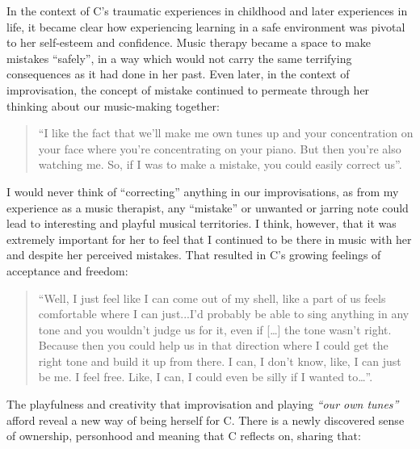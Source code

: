 \documentclass[authordate, empirical]{jote-new-article}
\begin{document}
In the context of C's traumatic experiences in childhood and later experiences in life, it became clear how experiencing learning in a safe environment was pivotal to her self-esteem and confidence. Music therapy became a space to make mistakes “safely”, in a way which would not carry the same terrifying consequences as it had done in her past. Even later, in the context of improvisation, the concept of mistake continued to permeate through her thinking about our music-making together:


\begin{quote}
  “I like the fact that we'll make me own tunes up and your concentration on your face where you're concentrating on your piano. But then you're also watching me. So, if I was to make a mistake, you could easily correct us”.
\end{quote}







I would never think of “correcting” anything in our improvisations, as from my experience as a music therapist, any “mistake” or unwanted or jarring note could lead to interesting and playful musical territories. I think, however, that it was extremely important for her to feel that I continued to be there in music with her\emph{ }and despite\emph{ }her perceived mistakes. That resulted in C's growing feelings of acceptance and freedom:\emph{ }







\begin{quote}
“Well, I just feel like I can come out of my shell, like a part of us feels comfortable where I can just...I'd probably be able to sing anything in any tone and you wouldn't judge us for it, even if […] the tone wasn't right. Because then you could help us in that direction where I could get the right tone and build it up from there. I can, I don't know, like, I can just be me. I feel free. Like, I can, I could even be silly if I wanted to…”.
\end{quote}







The playfulness and creativity that improvisation and playing \emph{“our own tunes”} afford reveal a new way of being herself for C. There is a newly discovered sense of ownership, personhood and meaning that C reflects on, sharing that:
\end{document}
